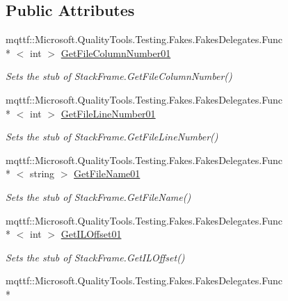 \subsection*{Public Attributes}
\begin{DoxyCompactItemize}
\item 
mqttf\-::\-Microsoft.\-Quality\-Tools.\-Testing.\-Fakes.\-Fakes\-Delegates.\-Func\\*
$<$ int $>$ \hyperlink{class_system_1_1_diagnostics_1_1_fakes_1_1_stub_stack_frame_a60950a4f8ed32ac55bca4538b0e63852}{Get\-File\-Column\-Number01}
\begin{DoxyCompactList}\small\item\em Sets the stub of Stack\-Frame.\-Get\-File\-Column\-Number()\end{DoxyCompactList}\item 
mqttf\-::\-Microsoft.\-Quality\-Tools.\-Testing.\-Fakes.\-Fakes\-Delegates.\-Func\\*
$<$ int $>$ \hyperlink{class_system_1_1_diagnostics_1_1_fakes_1_1_stub_stack_frame_a73bba9693e621f7edf1dd26b0e32291a}{Get\-File\-Line\-Number01}
\begin{DoxyCompactList}\small\item\em Sets the stub of Stack\-Frame.\-Get\-File\-Line\-Number()\end{DoxyCompactList}\item 
mqttf\-::\-Microsoft.\-Quality\-Tools.\-Testing.\-Fakes.\-Fakes\-Delegates.\-Func\\*
$<$ string $>$ \hyperlink{class_system_1_1_diagnostics_1_1_fakes_1_1_stub_stack_frame_a7b75638e8b38727f48be4a17c6ba6b0c}{Get\-File\-Name01}
\begin{DoxyCompactList}\small\item\em Sets the stub of Stack\-Frame.\-Get\-File\-Name()\end{DoxyCompactList}\item 
mqttf\-::\-Microsoft.\-Quality\-Tools.\-Testing.\-Fakes.\-Fakes\-Delegates.\-Func\\*
$<$ int $>$ \hyperlink{class_system_1_1_diagnostics_1_1_fakes_1_1_stub_stack_frame_a6d6340cc7092fad0e78c3c9693c313ef}{Get\-I\-L\-Offset01}
\begin{DoxyCompactList}\small\item\em Sets the stub of Stack\-Frame.\-Get\-I\-L\-Offset()\end{DoxyCompactList}\item 
mqttf\-::\-Microsoft.\-Quality\-Tools.\-Testing.\-Fakes.\-Fakes\-Delegates.\-Func\\*

\end{DoxyCompactItemize}
